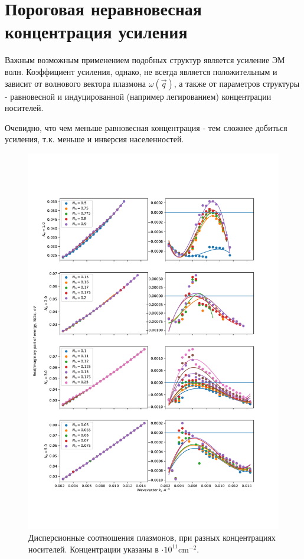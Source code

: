 \documentclass[../main.tex]{subfiles}
\begin{document}
    \section{Пороговая неравновесная концентрация усиления}

    Важным возможным применением подобных структур является усиление ЭМ волн. 
    Коэффициент усиления, однако, не всегда является положительным и 
    зависит от волнового вектора плазмона $\omega(\vec q)$, 
    а также от параметров структуры - равновесной и индуцированной 
    (например легированием) концентрации носителей. 

    Очевидно, что чем меньше равновесная концентрация - тем 
    сложнее добиться усиления, т.к. меньше и инверсия населенностей.

    


    \begin{figure}[h]
        \begin{minipage}[h]{1\textwidth}
            \includegraphics[width=1\textwidth]{./images/compare_plots_6nm_42K.pdf}
            \caption{Дисперсионные соотношения плазмонов, при разных концентрациях 
            носителей. \label{plasmon:compare_42}
            Концентрации указаны в $\cdot 10^{11} \text{cm}^{-2}$.}
        \end{minipage}
    \end{figure}
\end{document}
